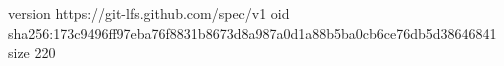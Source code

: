 version https://git-lfs.github.com/spec/v1
oid sha256:173c9496ff97eba76f8831b8673d8a987a0d1a88b5ba0cb6ce76db5d38646841
size 220
